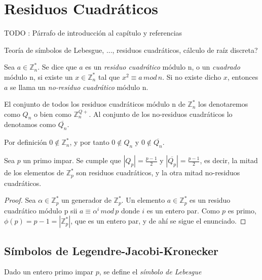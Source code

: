\chapter{Residuos Cuadráticos}\label{ch:qr} 

TODO : Párrafo de introducción al capítulo y referencias


Teoría de símbolos de Lebesgue, ..., residuos cuadráticos, cálculo de raíz discreta?




\begin{definition}
	Sea $a\in \mathbb{Z}^*_n$. Se dice que $a$ es un \textit{residuo cuadrático} módulo n, o un \textit{cuadrado} módulo n, si existe un $x \in \mathbb{Z}^*_n$ tal que $x^2 \equiv a \, mod \, n$.
	Si no existe dicho $x$, entonces $a$ se llama un \textit{no-residuo cuadrático} módulo n.
	
	El conjunto de todos los residuos cuadráticos módulo n de $\mathbb{Z}^*_n$ los denotaremos como $Q_n$ o bien como $\mathbb{Z}^{Q+}_n$.
	Al conjunto de los no-residuos cuadráticos lo denotamos como $\overline{Q_n}$.
\end{definition}

\begin{remark}
	Por definición $0 \notin \mathbb{Z}^*_n$, y por tanto $0 \notin Q_n$ y $0 \notin \overline{Q_n}$.
\end{remark}

\begin{proposition}
	Sea $p$ un primo impar. Se cumple que $|Q_p| = \frac{p-1}{2}$ y $|\overline{Q_p}| = \frac{p-1}{2}$, es decir, la mitad de los elementos de $\mathbb{Z}^*_p$ son residuos cuadráticos, y la otra mitad no-residuos cuadráticos.
\end{proposition}

\begin{proof}
	Sea $\alpha \in \mathbb{Z}^*_p$ un generador de $\mathbb{Z}^*_p$.
	Un elemento $a \in \mathbb{Z}^*_p$ es un residuo cuadrático módulo p sii $a \equiv \alpha^i \, mod \, p$ donde $i$ es un entero par. Como $p$ es primo, $\phi(p) = p-1 = |\mathbb{Z}^*_p|$, que es un entero par, y de ahí se sigue el enunciado.
\end{proof}


\section{Símbolos de Legendre-Jacobi-Kronecker}


\begin{definition}
	Dado un entero primo impar $p$, se define el \textit{símbolo de Lebesgue} 
\end{definition}
